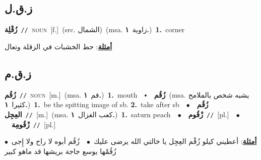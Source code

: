 \documentclass[10pt,a4paper,twoside]{article} %
\begin{document}
\begin{multicols}{2}
\vspace{-3mm}
\subsection*{\color{blue}\foreignlanguage{arabic}{ز.ق.ل}\color{blue}{}} 

{\setlength\topsep{0pt}\textbf{\foreignlanguage{arabic}{زُقْلِة}}\ {\color{gray}\texttt{//}\color{black}}\ \textsc{noun}\ [f.]\ (src. \color{gray}\foreignlanguage{arabic}{الشمال}\color{black})\ \color{gray}(msa. \foreignlanguage{arabic}{زاوية}~\foreignlanguage{arabic}{\textbf{١.}})\color{black}\ \textbf{1.}~corner\  \begin{flushright}\color{gray}\foreignlanguage{arabic}{\textbf{\underline{\foreignlanguage{arabic}{أمثلة}}}: حط الخشبات في الزقلة وتعال}\end{flushright}\color{black}} \vspace{2mm}

\vspace{-3mm}
\subsection*{\color{blue}\foreignlanguage{arabic}{ز.ق.م}\color{blue}{}} 

{\setlength\topsep{0pt}\textbf{\foreignlanguage{arabic}{زُقُم}}\ {\color{gray}\texttt{//}\color{black}}\ \textsc{noun}\ [m.]\ \color{gray}(msa. \foreignlanguage{arabic}{فم}~\foreignlanguage{arabic}{\textbf{١.}})\color{black}\ \textbf{1.}~mouth\ \ $\smblkdiamond$\ \ \setlength\topsep{0pt}\textbf{\foreignlanguage{arabic}{زُقُم}}\ \color{gray}(msa. \foreignlanguage{arabic}{يشبه شخص بالملامح كثيرا}~\foreignlanguage{arabic}{\textbf{١.}})\color{black}\ \textbf{1.}~be the spitting image of sb.  \textbf{2.}~take after sb\ \ $\bullet$\ \ \setlength\topsep{0pt}\textbf{\foreignlanguage{arabic}{زُقُم العِجِل}}\ {\color{gray}\texttt{//}\color{black}}\ [m.]\ \color{gray}(msa. \foreignlanguage{arabic}{كعب الغزال}~\foreignlanguage{arabic}{\textbf{١.}})\color{black}\ \textbf{1.}~saturn peach\ \ $\bullet$\ \ \setlength\topsep{0pt}\textbf{\foreignlanguage{arabic}{زْقُوم}}\ {\color{gray}\texttt{//}\color{black}}\ [pl.]\ \ $\bullet$\ \ \setlength\topsep{0pt}\textbf{\foreignlanguage{arabic}{زْقُومِة}}\ {\color{gray}\texttt{//}\color{black}}\ [pl.]\  \begin{flushright}\color{gray}\foreignlanguage{arabic}{\textbf{\underline{\foreignlanguage{arabic}{أمثلة}}}: أعطيني كيلو زُقْم العِجِل يا خالتي الله يرضى عليك\ $\bullet$\ \  زُقُم أبوه لا راح ولا إِجى\ $\bullet$\ \  زُقُمْها يوسع جاجة بريشها قد ماهو كبير}\end{flushright}\color{black}} \vspace{2mm}


\end{multicols}
\end{document}

